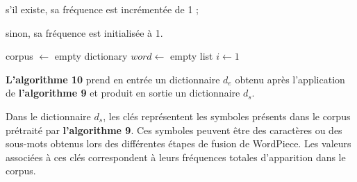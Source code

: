 \documentclass[12pt,a4paper]{report}
\begin{document}
	\begin{itemizeFB}
		\item s’il existe, sa fréquence est incrémentée de 1 ;
		\item sinon, sa fréquence est initialisée à 1.
	\end{itemizeFB}
	
	\begin{algorithm}[H]
		\caption{Preprocess}
		
		
		corpus $\leftarrow$ empty dictionary\;
		$word \leftarrow$ empty list\;
		$i \leftarrow 1$\;
		
		
		
		
	\end{algorithm}
	
	\vspace{0.5cm}
	
	\textbf{L’algorithme 10} prend en entrée un dictionnaire $d_e$ obtenu après l’application de \textbf{l’algorithme 9} et produit en sortie un dictionnaire $d_s$.
	
	Dans le dictionnaire $d_s$, les clés représentent les symboles présents dans le corpus prétraité par \textbf{l’algorithme 9}. Ces symboles peuvent être des caractères ou des sous-mots obtenus lors des différentes étapes de fusion de WordPiece. Les valeurs associées à ces clés correspondent à leurs fréquences totales d’apparition dans le corpus.
	
\end{document}
